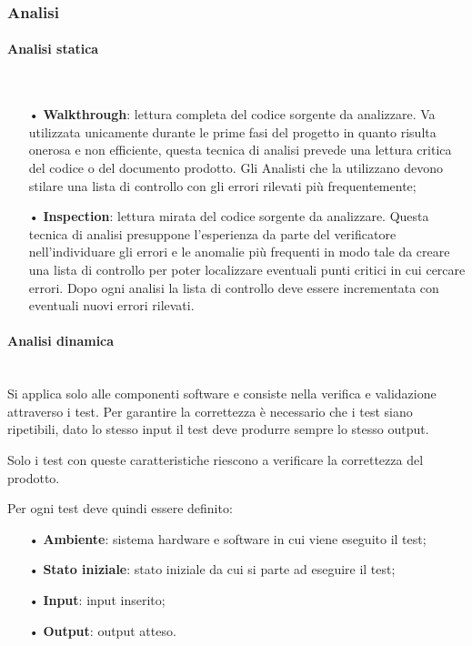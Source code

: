 \subsubsection{Analisi}


\paragraph{Analisi statica}\mbox{}\\
\begin{itemize}
\item[•] \textbf{Walkthrough}: lettura completa del codice sorgente da analizzare. Va utilizzata unicamente durante le prime fasi del progetto in quanto risulta onerosa e non efficiente, questa tecnica di analisi prevede una lettura critica del codice o del documento prodotto. Gli Analisti che la utilizzano devono stilare una lista di controllo con gli errori rilevati più frequentemente;
\item[•] \textbf{Inspection}: lettura mirata del codice sorgente da analizzare. Questa tecnica di analisi presuppone l’esperienza da parte del verificatore nell’individuare gli errori e le anomalie più frequenti in modo tale da creare una lista di controllo per poter localizzare eventuali punti critici in cui cercare errori. Dopo ogni analisi la lista di controllo deve essere incrementata con eventuali nuovi errori rilevati.
\end{itemize}

\paragraph{Analisi dinamica}\mbox{}\\
Si applica solo alle componenti software e consiste nella verifica e validazione attraverso i test. Per garantire la correttezza è necessario che i test siano ripetibili, dato lo stesso input il test deve produrre sempre lo stesso output.  

Solo i test con queste caratteristiche riescono a verificare la correttezza del prodotto.

Per ogni test deve quindi essere definito: 
\begin{itemize}
\item[•] \textbf{Ambiente}: sistema hardware e software in cui viene eseguito il test; 
\item[•]\textbf{Stato iniziale}: stato iniziale da cui si parte ad eseguire il test; 
\item[•] \textbf{Input}: input inserito;
\item[•] \textbf{Output}: output atteso.
\end{itemize}

